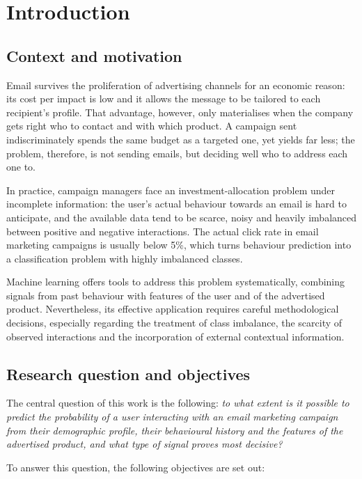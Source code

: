 \chapter{Introduction}

\section{Context and motivation}

Email survives the proliferation of advertising channels for an economic reason: its cost per impact is low and it allows the message to be tailored to each recipient's profile. That advantage, however, only materialises when the company gets right who to contact and with which product. A campaign sent indiscriminately spends the same budget as a targeted one, yet yields far less; the problem, therefore, is not sending emails, but deciding well who to address each one to.

In practice, campaign managers face an investment-allocation problem under incomplete information: the user's actual behaviour towards an email is hard to anticipate, and the available data tend to be scarce, noisy and heavily imbalanced between positive and negative interactions. The actual click rate in email marketing campaigns is usually below 5\%, which turns behaviour prediction into a classification problem with highly imbalanced classes.

Machine learning offers tools to address this problem systematically, combining signals from past behaviour with features of the user and of the advertised product. Nevertheless, its effective application requires careful methodological decisions, especially regarding the treatment of class imbalance, the scarcity of observed interactions and the incorporation of external contextual information.

\section{Research question and objectives}

The central question of this work is the following: \textit{to what extent is it possible to predict the probability of a user interacting with an email marketing campaign from their demographic profile, their behavioural history and the features of the advertised product, and what type of signal proves most decisive?}

To answer this question, the following objectives are set out:

